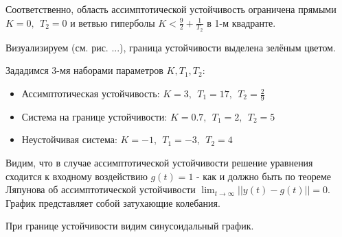 \begin{par}
\begin{flushleft}
Соответственно, область ассимптотической устойчивость ограничена прямыми $K=0,~~T_2 =0$ и ветвью гиперболы $K<\frac{9}{2}+\frac{1}{T_2 }$ в 1-м квадранте.
\end{flushleft}
\end{par}

\begin{par}
\begin{flushleft}
Визуализируем (см. рис. ...), граница устойчивости выделена зелёным цветом.
\end{flushleft}
\end{par}


\vspace{1em}
\begin{par}
\begin{flushleft}
Зададимся 3-мя наборами параметров $K,T_1 ,T_2$:
\end{flushleft}
\end{par}

\begin{itemize}
\setlength{\itemsep}{-1ex}
   \item{\begin{flushleft} Ассимптотическая устойчивость: $K=3,~~T_1 =17,~~T_2 =\frac{2}{9}$ \end{flushleft}}
   \item{\begin{flushleft} Система на границе устойчивости: $K=0.7,~~T_1 =2,~~T_2 =5$ \end{flushleft}}
   \item{\begin{flushleft} Неустойчивая система: $K=-1,~~T_1 =-3,~~T_2 =4$ \end{flushleft}}
\end{itemize}

\begin{par}
\begin{flushleft}
Видим, что в случае ассимптотической устойчивости решение уравнения сходится к входному воздействию $g(t)=1$ - как и должно быть по теореме Ляпунова об ассимптотической устойчивости $\lim_{t\to \infty } ||y(t)-g(t)||=0$.  График представляет собой затухающие колебания.
\end{flushleft}
\end{par}

\begin{par}
\begin{flushleft}
При границе устойчивости видим синусоидальный график.
\end{flushleft}
\end{par}

